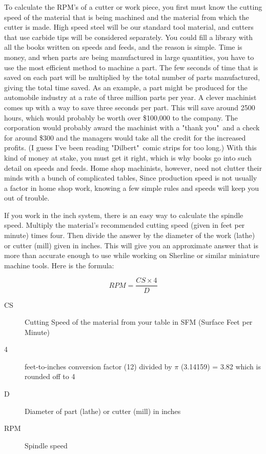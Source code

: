 To calculate the RPM's of a cutter or work piece, you first must know the
cutting speed of the material that is being machined and the material from which
the cutter is made. High speed steel will be our standard tool material, and
cutters that use carbide tips will be considered separately. You could fill a
library with all the books written on speeds and feeds, and the reason is
simple. Time is money, and when parts are being manufactured in large
quantities, you have to use the most efficient method to machine a part. The few
seconds of time that is saved on each part will be multiplied by the total
number of parts manufactured, giving the total time saved. As an example, a part
might be produced for the automobile industry at a rate of three million parts
per year. A clever machinist comes up with a way to save three seconds per part.
This will save around 2500 hours, which would probably be worth over \$100,000
to the company. The corporation would probably award the machinist with a "thank
you"\ and a check for around \$300 and the managers would take all the credit for
the increased profits. (I guess I've been reading "Dilbert"\ comic strips for too
long.) With this kind of money at stake, you must get it right, which is why
books go into such detail on speeds and feeds. Home shop machinists, however,
need not clutter their minds with a bunch of complicated tables, Since
production speed is not usually a factor in home shop work, knowing a few simple
rules and speeds will keep you out of trouble.

If you work in the inch system, there is an easy way to calculate the spindle
speed. Multiply the material's recommended cutting speed (given in feet per
minute) times four. Then divide the answer by the diameter of the work (lathe)
or cutter (mill) given in inches. This will give you an approximate answer that
is more than accurate enough to use while working on Sherline or similar
miniature machine tools. Here is the formula:

\begin{equation}
RPM=\frac{CS \times 4}{D}
\end{equation}

\begin{description}
\item[CS] Cutting Speed of the material from your table in SFM (Surface Feet per
Minute)
\item[4] feet-to-inches conversion factor (12) divided by $\pi$ (3.14159) =
3.82 which is rounded off to 4
\item[D] Diameter of part (lathe) or cutter (mill) in inches
\item[RPM] Spindle speed
\end{description}

